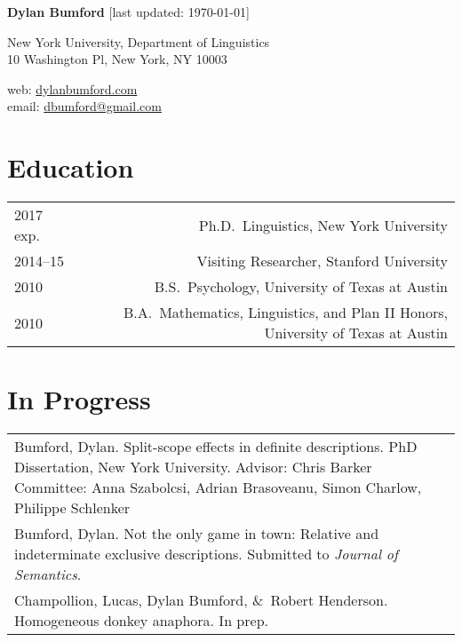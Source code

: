\documentclass[12pt]{article}
\renewcommand{\arraystretch}{1.5} %
\newcommand{\with}{\&}
\begin{document}
\textbf{Dylan Bumford}\hfill
{\color{gray}[last updated: \today]}

\bigskip

\begin{minipage}[t]{0.55\textwidth}
New York University, Department of Linguistics\\
10 Washington Pl, New York, NY 10003
\end{minipage}
\begin{minipage}[t]{\linegoal}
\raggedleft%
web: \url{dylanbumford.com}\\
email: \href{mailto:dbumford@gmail.com}{dbumford@gmail.com}
\end{minipage}

\bigskip

\section*{Education}

\begingroup
\renewcommand{\arraystretch}{1} %
\begin{longtable}{LR}
  2017 exp.   & Ph.D.~Linguistics, New York University\\
  2014--15    & Visiting Researcher, Stanford University\\
  2010        & B.S.~Psychology, University of Texas at Austin\\
  2010        & B.A.~Mathematics, Linguistics, and Plan II Honors, University of
                Texas at Austin
\end{longtable}
\endgroup

\bigskip

\section*{In Progress}

\begin{longtable}{@{}p{\textwidth}@{}}
  Bumford, Dylan. Split-scope effects in definite descriptions. PhD
  Dissertation, New York University.\newline
  Advisor: Chris Barker\newline
  Committee: Anna Szabolcsi, Adrian Brasoveanu, Simon Charlow, Philippe
  Schlenker\\
  Bumford, Dylan. Not the only game in town: Relative and indeterminate exclusive
  descriptions. Submitted to \textit{Journal of Semantics}.\\
  Champollion, Lucas, Dylan Bumford, \with~Robert Henderson. Homogeneous 
  donkey anaphora. In prep.
\end{longtable}
\end{document}
